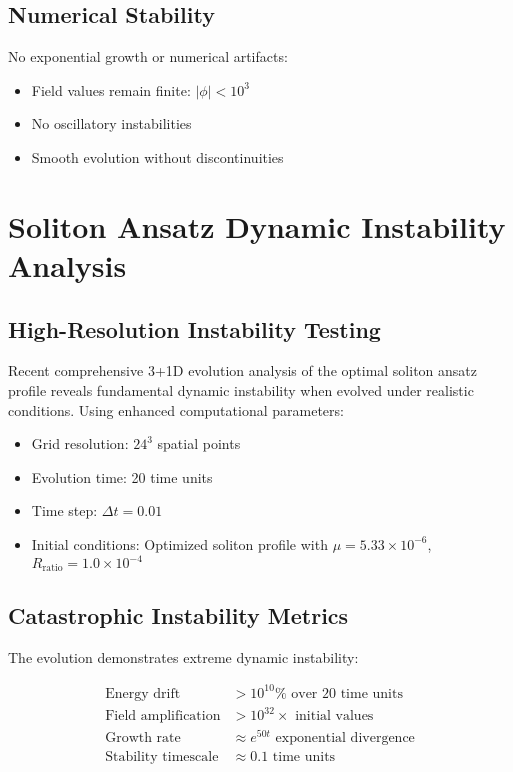 \documentclass[11pt,a4paper]{article}
\begin{document}
\subsection{Numerical Stability}

No exponential growth or numerical artifacts:
\begin{itemize}
\item Field values remain finite: $|\phi| < 10^3$
\item No oscillatory instabilities
\item Smooth evolution without discontinuities
\end{itemize}

\section{Soliton Ansatz Dynamic Instability Analysis}

\subsection{High-Resolution Instability Testing}

Recent comprehensive 3+1D evolution analysis of the optimal soliton ansatz profile reveals fundamental dynamic instability when evolved under realistic conditions. Using enhanced computational parameters:

\begin{itemize}
\item Grid resolution: $24^3$ spatial points
\item Evolution time: 20 time units
\item Time step: $\Delta t = 0.01$
\item Initial conditions: Optimized soliton profile with $\mu = 5.33 \times 10^{-6}$, $R_{\text{ratio}} = 1.0 \times 10^{-4}$
\end{itemize}

\subsection{Catastrophic Instability Metrics}

The evolution demonstrates extreme dynamic instability:

\begin{align}
\text{Energy drift} &> 10^{10}\% \text{ over 20 time units} \\
\text{Field amplification} &> 10^{32} \times \text{ initial values} \\
\text{Growth rate} &\approx e^{50t} \text{ exponential divergence} \\
\text{Stability timescale} &\approx 0.1 \text{ time units}
\end{align}
\end{document}
